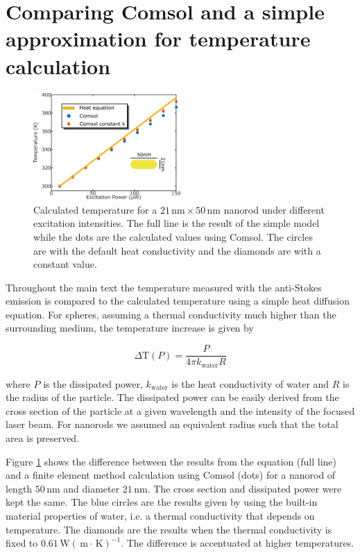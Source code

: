 \documentclass[journal=nalefd,manuscript=letter]{achemso}
\newcommand{\K}{\ensuremath{\,\textrm{K}}}
\newcommand{\nm}{\ensuremath{\,\textrm{nm}}}
\newcommand{\m}{\ensuremath{\,\textrm{m}}}
\newcommand{\W}{\ensuremath{\,\textrm{W}}}
\begin{document}
\section{Comparing Comsol and a simple approximation for temperature
calculation} \begin{figure}[htp] \centering
\includegraphics[width=0.5\textwidth]{Figures/Supplementary/03_Compare_Comsol/03_Compare_Comsol.png}
\caption{Calculated temperature for a $21\nm\times 50\nm$ nanorod under
different excitation intensities. The full line is the result of the simple
model while the dots are the calculated values using Comsol. The circles are
with the default heat conductivity and the diamonds are with a constant value.}
	\label{fig:Compare-Comsol}
\end{figure}

Throughout the main text the temperature measured with the anti-Stokes emission
is compared to the calculated temperature using a simple heat diffusion
equation. For spheres, assuming a thermal conductivity much higher than the
surrounding medium, the temperature increase is given by

\begin{equation}
	\Delta \textrm{T}(P) = \frac{P}{4\pi k_{\textrm{water}} R}
\end{equation}

\noindent where $P$ is the dissipated power, $k_{\textrm{water}}$ is the heat
conductivity of water and $R$ is the radius of the particle. The dissipated power can be
easily derived from the cross section of the particle at a given wavelength and
the intensity of the focused laser beam. For nanorods we assumed an
equivalent radius such that the total area is preserved.

Figure \ref{fig:Compare-Comsol} shows the difference between the results from
the equation (full line) and a finite element method calculation using Comsol
(dots) for a nanorod of length $50\nm$ and diameter $21\nm$. The cross section
and dissipated power were kept the same. The blue circles are the results given
by using the built-in material properties of water, i.e. a thermal conductivity
that depends on temperature. The diamonds are the results when the thermal
conductivity is fixed to $0.61 \W(\m\cdot\K)^{-1}$. The difference is
accentuated at higher temperatures.
\end{document}
